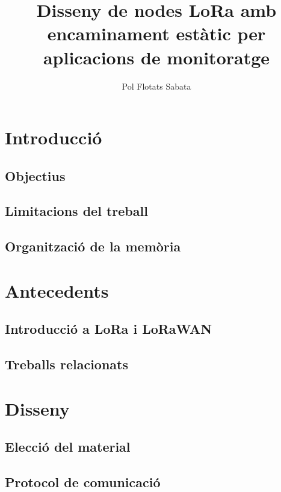 \documentclass{tfgitic}[2025/06/06]
\title{Disseny de nodes LoRa amb encaminament estàtic per aplicacions de monitoratge}
\author{Pol Flotats Sabata}
\begin{document}

\chapter{Introducció}
\section{Objectius}
\section{Limitacions del treball}
\section{Organització de la memòria}

\chapter{Antecedents}
\section{Introducció a LoRa i LoRaWAN}
\section{Treballs relacionats}

\chapter{Disseny} %
\section{Elecció del material}
\section{Protocol de comunicació}
\end{document}
